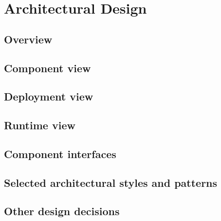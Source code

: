 \section{Architectural Design}

\subsection{Overview}

\subsection{Component view}

\subsection{Deployment view}

\subsection{Runtime view}

\subsection{Component interfaces}

\subsection{Selected architectural styles and patterns}

\subsection{Other design decisions}
